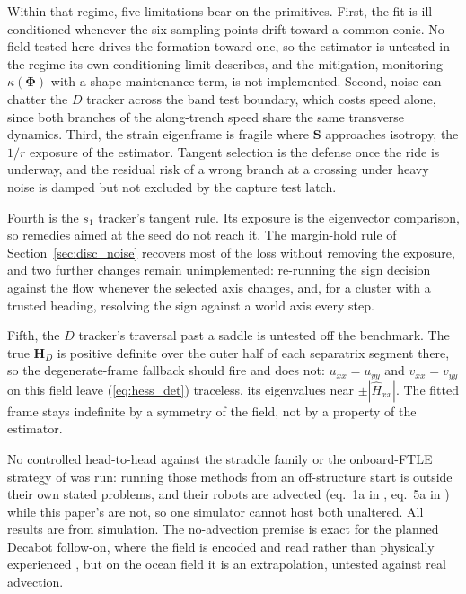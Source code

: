 \documentclass[lettersize,journal]{IEEEtran}
\begin{document}
Within that regime, five limitations bear on the primitives. First, the
fit is ill-conditioned whenever the six sampling points drift toward a
common conic. No field tested here drives the formation toward one, so
the estimator is untested in the regime its own conditioning limit
describes, and the mitigation, monitoring
$\kappa(\boldsymbol{\Phi})$ with a shape-maintenance term, is not
implemented.
Second, noise can chatter the $D$ tracker across the band test
boundary, which costs speed alone, since both branches of the
along-trench speed share the same transverse dynamics. Third, the
strain eigenframe is fragile where $\mathbf{S}$ approaches isotropy,
the $1/r$ exposure of the estimator. Tangent selection is the defense once the ride is
underway, and the residual risk of a wrong branch at a crossing under
heavy noise is damped but not excluded by the capture test latch.

Fourth is the $s_1$ tracker's tangent rule. Its exposure
is the eigenvector comparison, so remedies aimed at
the seed do not reach it. The margin-hold rule of
Section~\ref{sec:disc_noise} recovers most of the loss without removing
the exposure, and two further changes remain unimplemented:
re-running the sign decision against the flow whenever the selected axis
changes, and, for a cluster with a trusted heading, resolving the sign
against a world axis every step.

Fifth, the $D$ tracker's traversal past a saddle is untested off the
benchmark. The true $\mathbf{H}_D$ is positive definite over the outer
half of each separatrix segment there, so the degenerate-frame fallback
should fire and does not: $u_{xx} = u_{yy}$
and $v_{xx} = v_{yy}$ on this field leave (\ref{eq:hess_det}) traceless,
its eigenvalues near $\pm|\hat{H}_{xx}|$. The fitted frame stays
indefinite by a symmetry of the field, not by a property of the
estimator.

No controlled head-to-head against the straddle family \cite{26,27,28} or
the onboard-FTLE strategy of \cite{30} was run: running those methods
from an off-structure start is outside their own stated problems, and
their robots are advected (eq.~1a in \cite{26}, eq.~5a in \cite{30})
while this paper's are not, so one simulator cannot host both unaltered. All
results are from simulation. The no-advection premise is exact for the
planned Decabot follow-on, where the field is encoded and read rather
than physically experienced \cite{34}, but on the ocean field it
is an extrapolation, untested against real advection.
\end{document}
